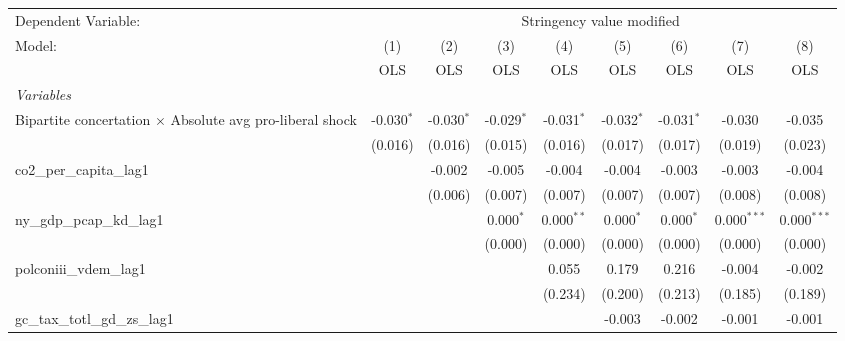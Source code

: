 
\begingroup
\centering
\begin{tabular}{lcccccccc}
   \toprule
   Dependent Variable: & \multicolumn{8}{c}{Stringency value modified}\\
   Model:                                                          & (1)          & (2)          & (3)          & (4)          & (5)          & (6)          & (7)           & (8)\\  
                                                                   &  OLS         & OLS          & OLS          & OLS          & OLS          & OLS          & OLS           & OLS\\  
   \midrule
   \emph{Variables}\\
   Bipartite concertation $\times$ Absolute avg pro-liberal shock  & -0.030$^{*}$ & -0.030$^{*}$ & -0.029$^{*}$ & -0.031$^{*}$ & -0.032$^{*}$ & -0.031$^{*}$ & -0.030        & -0.035\\   
                                                                   & (0.016)      & (0.016)      & (0.015)      & (0.016)      & (0.017)      & (0.017)      & (0.019)       & (0.023)\\   
   co2\_per\_capita\_lag1                                          &              & -0.002       & -0.005       & -0.004       & -0.004       & -0.003       & -0.003        & -0.004\\   
                                                                   &              & (0.006)      & (0.007)      & (0.007)      & (0.007)      & (0.007)      & (0.008)       & (0.008)\\   
   ny\_gdp\_pcap\_kd\_lag1                                         &              &              & 0.000$^{*}$  & 0.000$^{**}$ & 0.000$^{*}$  & 0.000$^{*}$  & 0.000$^{***}$ & 0.000$^{***}$\\   
                                                                   &              &              & (0.000)      & (0.000)      & (0.000)      & (0.000)      & (0.000)       & (0.000)\\   
   polconiii\_vdem\_lag1                                           &              &              &              & 0.055        & 0.179        & 0.216        & -0.004        & -0.002\\   
                                                                   &              &              &              & (0.234)      & (0.200)      & (0.213)      & (0.185)       & (0.189)\\   
   gc\_tax\_totl\_gd\_zs\_lag1                                     &              &              &              &              & -0.003       & -0.002       & -0.001        & -0.001\\   

\end{tabular}
